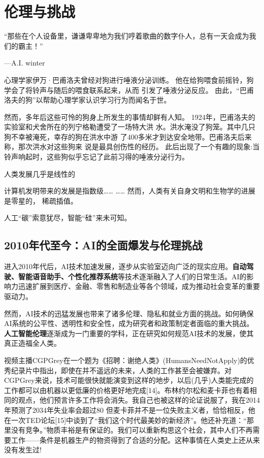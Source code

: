 \chapter{伦理与挑战}
“那些在个人设备里，谦谦卑卑地为我们哼着歌曲的数字仆人，总有一天会成为我们的霸主！”
\begin{flushright}
---A.I. winter
\end{flushright}

心理学家伊万·巴甫洛夫曾经对狗进行唾液分泌训练。
他在给狗喂食前摇铃，狗学会了将铃声与随后的喂食联系起来，从而
引发了唾液分泌反应。
由此，“巴甫洛夫的狗”以帮助心理学家认识学习行为而闻名于世。

然而，多年后这些可怜的狗身上所发生的事情却鲜有人知。
1924年，巴甫洛夫的实验室和犬舍所在的列宁格勒遭受了一场特大洪 水。洪水淹没了狗笼。其中几只狗不幸被淹死，幸存的狗在洪水中游 了400多米才到达安全地带。巴甫洛夫后来称，那次洪水对这些狗来 说是最具创伤性的经历。
此后出现了一个有趣的现象:当铃声响起时，这些狗似乎忘记了此前习得的唾液分泌行为。

人类发展几乎是线性的

计算机发明带来的发展是指数级……
……
然而，人类有关自身文明和生物学的进展是零星的， 稀疏插值。

人工“碳”索意犹尽，智能“硅”来未可知。

\section{2010年代至今：AI的全面爆发与伦理挑战}
进入2010年代后，AI技术加速发展，逐步从实验室迈向广泛的现实应用。{\bf 自动驾驶、智能语音助手、个性化推荐系统}等技术逐渐融入了人们的日常生活。AI的影响力迅速扩展到医疗、金融、零售和制造业等各个领域，成为推动社会变革的重要驱动力。

然而，AI技术的迅猛发展也带来了诸多伦理、隐私和就业方面的挑战。如何确保AI系统的公平性、透明性和安全性，成为研究者和政策制定者面临的重大挑战。{\bf 人工智能伦理}逐渐成为一门重要的学科，正在研究如何规范AI技术的发展，使其真正造福全人类。


视频主播CGPGrey在一个题为《招聘：谢绝人类》(HumansNeedNotApply)的优秀纪录片中指出，即使在并不遥远的未来，人类的工作甚至会被嫌弃。对CGPGrey来说，技术可能很快就能演变到这样的地步，以后(几乎)人类能完成的工作都可以由机器以更低廉的价格更好地完成[14]。布林约尔松和麦卡菲也有着相同的观点，他们预言许多工作将会消失。我自己也被这样的论证说服了，我在2014年预测了2034年失业率会超过80%
但麦卡菲并不是一位失败主义者，恰恰相反，他在一次TED论坛[15]中谈到了“我们这个时代最美妙的新经济”。他还补充道：“那里没有竞争。”物质丰裕是有保证的。我们可以重新构思这个社会，其中人们不再需要工作——条件是机器生产的物资得到了合适的分配。这种事情在人类史上还从来没有发生过!

